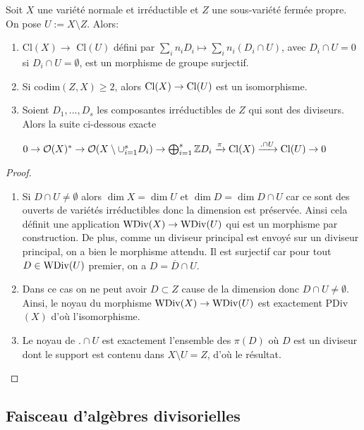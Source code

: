 \begin{thm}\label{divexactseq}
Soit $X$ une variété normale et irréductible et $Z$ une sous-variété fermée propre. On pose $U:=X\setminus Z$. Alors:
\begin{enumerate}
\item Cl$(X)\rightarrow$ Cl$(U)$ défini par $\sum_i n_iD_i\mapsto \sum_i n_i(D_i\cap U)$, avec $D_i\cap U = 0$ si $D_i\cap U=\emptyset $, est un morphisme de groupe surjectif.
\item Si codim$(Z,X)\geq 2$, alors $\operatorname{Cl}(X)\rightarrow \operatorname{Cl}(U)$ est un isomorphisme.
\item Soient $D_1,..., D_s$ les composantes irréductibles de $Z$ qui sont des diviseurs. Alors la suite ci-dessous exacte
\begin{center}
 $0\rightarrow\mathcal{O}(X)^*\rightarrow \mathcal{O}(X\setminus \cup_{i=1}^sD_i)\rightarrow \bigoplus_{i=1}^s \mathbb{Z} D_i \xrightarrow{\pi} \operatorname{Cl}(X) \xrightarrow{.\cap U} \operatorname{Cl}(U) \rightarrow 0 $
\end{center}

\end{enumerate}
\end{thm}
\begin{proof}
\begin{enumerate}
\item Si $D\cap U\neq \emptyset$ alors $\dim X=\dim U$ et $\dim D=\dim D\cap U$ car ce sont des ouverts de variétés irréductibles donc la dimension est préservée. Ainsi cela définit une application $\operatorname{WDiv}(X)\rightarrow \operatorname{WDiv}(U)$ qui est un morphisme par construction. De plus, comme un diviseur principal est envoyé sur un diviseur principal, on a bien le morphisme attendu. Il est surjectif car pour tout $D\in\operatorname{WDiv}(U)$ premier, on a $D=\overline{D}\cap U$.
\item Dans ce cas on ne peut avoir $D\subset Z$ cause de la dimension donc $D\cap U\neq \emptyset$. Ainsi, le noyau du morphisme $\operatorname{WDiv}(X)\rightarrow \operatorname{WDiv}(U)$ est exactement PDiv$(X)$ d'où l'isomorphisme.
\item Le noyau de $.\cap U$ est exactement l'ensemble des $\pi(D)$ où $D$ est un diviseur dont le support est contenu dans $X\setminus U=Z$, d'où le résultat.
\end{enumerate}
\end{proof}

\subsection{Faisceau d'algèbres divisorielles}

